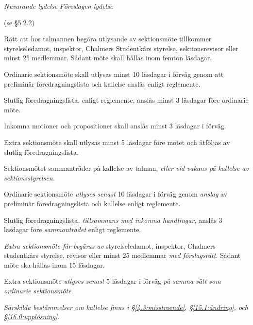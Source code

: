 \documentclass{article}
\newenvironment{lydelse}
    {\begin{paracol}{2}%
        \emph{Nuvarande lydelse}%
        \switchcolumn%
        \emph{Föreslagen lydelse}%
    \end{paracol}%
    \begin{enumerate}[label=\thesubsection.\arabic*]%
    \begin{paracol}{2}%
    }{\end{paracol}\end{enumerate}}
\begin{document}
\begin{lydelse}
  \item[] (se \S 5.2.2)
  \item Rätt att hos talmannen begära utlysande av
    sek\-tions\-möte tillkommer styrelseledamot, inspektor,  Chalmers Studentkårs styrelse, sek\-ti\-ons\-revisor  eller minst 25 medlemmar. Sådant möte skall hållas inom femton läsdagar.

  \item Ordinarie sektionsmöte skall utlysas minst 10 läsdagar i
    förväg genom att preliminär föredragningslista och kallelse an\-slås enligt
    reglemente. 
    
  \item Slutlig föredragningslista, enligt reglemente, anslås minst 3 läsdagar före ordinarie möte. 
    
  \item Inkomna motioner och propositioner skall anslås
    minst 3 läsdagar i förväg.
    
  \item Extra sektionsmöte skall utlysas minst 5 läsdagar före mötet
    och åt\-följ\-as av slutlig föredragningslista.

\switchcolumn
  \item Sektionsmötet sammanträder på kallelse av talman, \emph{eller vid vakans på kallelse av sektionsstyrelsen.}

  \item Ordinarie sektionsmöte \emph{utlyses senast} 10 läsdagar i förväg genom \emph{anslag} av preliminär föredragningslista och kallelse enligt reglemente.

  \item Slutlig föredragningslista\emph{, tillsammans med inkomna handlingar,} anslås 3 läsdagar före \emph{sammanträdet} enligt reglemente.

  \item \emph{Extra sektionsmöte får begäras av} styrelseledamot, inspektor,
    Chalmers studentkårs styrelse, revisor eller minst 25 medlemmar \emph{med förslagsrätt}.
    Sådant möte ska hållas inom 15 läsdagar.
  
  \item Extra sektionsmöte \emph{utlyses senast} 5 läsdagar i förväg \emph{på samma sätt som ordinarie sektionsmöte}.

  \item \emph{Särskilda bestämmelser om kallelse finns i \S\ref{4.3:misstroende}, \S\ref{15.1:ändring}, och \S\ref{16.0:upplösning}.}
\end{lydelse}
\end{document}
